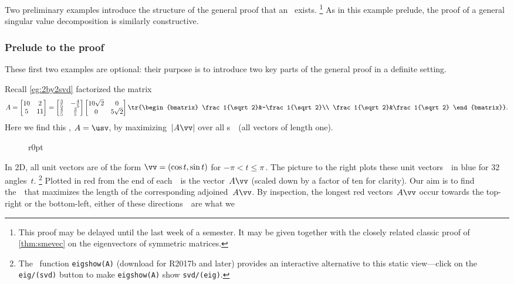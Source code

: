 Two preliminary examples introduce the structure of the general proof that an \svd\ exists.%
\footnote{This proof may be delayed until the last week of a semester.
It may be given together with the closely related classic proof of \cref{thm:smevec} on the eigenvectors of symmetric matrices.}
As in this example prelude, the proof of a general singular value decomposition is similarly constructive.

\subsubsection{Prelude to the proof}

These first two examples are optional: their purpose is to introduce two key parts of the general proof in a definite setting.

\begin{example} \label{eg:2by2svdx}
Recall \cref{eg:2by2svd} factorized the matrix
\begin{equation*}
A=\begin{bmatrix} 10&2\\5&11 \end{bmatrix}=
\begin{bmatrix} \frac35&-\frac45\\\frac45&\frac35 \end{bmatrix}
\begin{bmatrix} 10\sqrt2&0\\0&5\sqrt2 \end{bmatrix}
\tr{\begin{bmatrix} \frac1{\sqrt2}&-\frac1{\sqrt2}\\ \frac1{\sqrt2}&\frac1{\sqrt2} \end{bmatrix}}.
\end{equation*}
Here we find this , \(A=\usv\), by maximizing~\(|A\vv|\) over all s~\vv\ (all vectors of length one).

\begin{solution} 
\begin{figure}r{0pt}
\end{figure}
In 2D, all unit vectors are of the form \(\vv=(\cos t,\sin t)\) for \(-\pi<t\leq\pi\)\,.  
The picture to the right plots these unit vectors~\vv\ in blue for 32 angles~\(t\).%
\footnote{The \script[1]\ function \texttt{eigshow(A)} (download for R2017b and later) provides an interactive alternative to this static view---click on the \texttt{eig/(svd)} button to make \texttt{eigshow(A)} show \texttt{svd/(eig)}.}
Plotted in red from the end of each~\vv\ is the vector~\(A\vv\) (scaled down by a factor of ten for clarity).
Our aim is to find the~\vv\ that maximizes the length of the corresponding adjoined~\(A\vv\).
By inspection, the longest red vectors~\(A\vv\) occur towards the top-right or the bottom-left, either of these directions~\vv\ are what we 


\end{solution}
\end{example}
